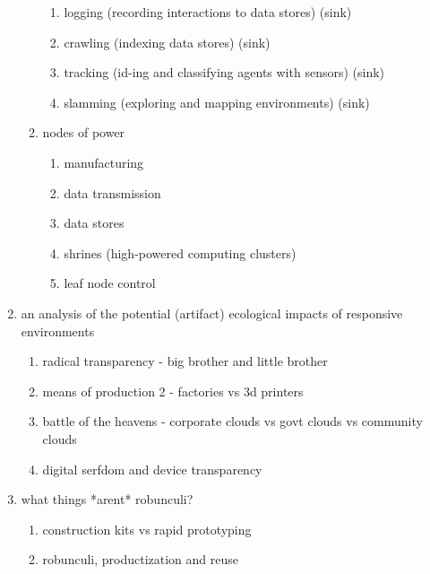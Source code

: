\begin{enumerate}
\begin{enumerate}
\begin{enumerate}
            \item logging (recording interactions to data stores) (sink)
            \item crawling (indexing data stores) (sink)
            \item tracking (id-ing and classifying agents with sensors) (sink)
            \item slamming (exploring and mapping environments) (sink)
        \end{enumerate}
        \item nodes of power
        \begin{enumerate}
            \item manufacturing
            \item data transmission
            \item data stores
            \item shrines (high-powered computing clusters)
            \item leaf node control
        \end{enumerate}        
    \end{enumerate}
    \item an analysis of the potential (artifact) ecological impacts of responsive environments
    \begin{enumerate}
        \item radical transparency - big brother and little brother
        \item means of production 2 - factories vs 3d printers
        \item battle of the heavens - corporate clouds vs govt clouds vs community clouds
        \item digital serfdom and device transparency
    \end{enumerate}
    \item what things *arent* robunculi?
    \begin{enumerate}
        \item construction kits vs rapid prototyping
        \item robunculi, productization and reuse
    \end{enumerate}
\end{enumerate}
